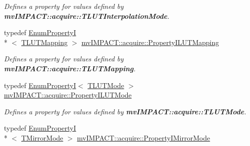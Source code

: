 \begin{DoxyCompactItemize}
\begin{DoxyCompactList}\small\item\em Defines a property for values defined by {\bfseries mv\+I\+M\+P\+A\+C\+T\+::acquire\+::\+T\+L\+U\+T\+Interpolation\+Mode}. \end{DoxyCompactList}\item 
\hypertarget{group___common_interface_ga2641eda4be7328bd1e2af06cc136fb4b}{typedef \hyperlink{classmv_i_m_p_a_c_t_1_1acquire_1_1_enum_property_i}{Enum\+Property\+I}\\*
$<$ \hyperlink{group___common_interface_ga161dbf21975385f4cd6bd555fd39298c}{T\+L\+U\+T\+Mapping} $>$ \hyperlink{group___common_interface_ga2641eda4be7328bd1e2af06cc136fb4b}{mv\+I\+M\+P\+A\+C\+T\+::acquire\+::\+Property\+I\+L\+U\+T\+Mapping}}\label{group___common_interface_ga2641eda4be7328bd1e2af06cc136fb4b}

\begin{DoxyCompactList}\small\item\em Defines a property for values defined by {\bfseries mv\+I\+M\+P\+A\+C\+T\+::acquire\+::\+T\+L\+U\+T\+Mapping}. \end{DoxyCompactList}\item 
\hypertarget{group___common_interface_ga64e784bb1c97e3a3eed6ff572935e5d2}{typedef \hyperlink{classmv_i_m_p_a_c_t_1_1acquire_1_1_enum_property_i}{Enum\+Property\+I}$<$ \hyperlink{group___common_interface_ga622d4fe4aa7b262752e9101c78f87f57}{T\+L\+U\+T\+Mode} $>$ \hyperlink{group___common_interface_ga64e784bb1c97e3a3eed6ff572935e5d2}{mv\+I\+M\+P\+A\+C\+T\+::acquire\+::\+Property\+I\+L\+U\+T\+Mode}}\label{group___common_interface_ga64e784bb1c97e3a3eed6ff572935e5d2}

\begin{DoxyCompactList}\small\item\em Defines a property for values defined by {\bfseries mv\+I\+M\+P\+A\+C\+T\+::acquire\+::\+T\+L\+U\+T\+Mode}. \end{DoxyCompactList}\item 
\hypertarget{group___common_interface_ga6adf15b90e84144e36bdfa8e26fb38de}{typedef \hyperlink{classmv_i_m_p_a_c_t_1_1acquire_1_1_enum_property_i}{Enum\+Property\+I}\\*
$<$ \hyperlink{group___common_interface_ga3b84e6791167cb1e9b91a6318816979e}{T\+Mirror\+Mode} $>$ \hyperlink{group___common_interface_ga6adf15b90e84144e36bdfa8e26fb38de}{mv\+I\+M\+P\+A\+C\+T\+::acquire\+::\+Property\+I\+Mirror\+Mode}}\label{group___common_interface_ga6adf15b90e84144e36bdfa8e26fb38de}


\end{DoxyCompactItemize}
